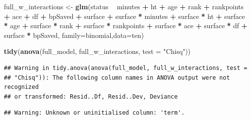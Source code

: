 \documentclass[]{article}
\newenvironment{Shaded}{\begin{snugshade}}{\end{snugshade}}
\newcommand{\DataTypeTok}[1]{\textcolor[rgb]{0.13,0.29,0.53}{#1}}
\newcommand{\KeywordTok}[1]{\textcolor[rgb]{0.13,0.29,0.53}{\textbf{#1}}}
\newcommand{\NormalTok}[1]{#1}
\newcommand{\OperatorTok}[1]{\textcolor[rgb]{0.81,0.36,0.00}{\textbf{#1}}}
\newcommand{\StringTok}[1]{\textcolor[rgb]{0.31,0.60,0.02}{#1}}
\begin{document}
\begin{Shaded}
\begin{Highlighting}[]
\NormalTok{full_w_interactions <-}\StringTok{ }\KeywordTok{glm}\NormalTok{(status }\OperatorTok{~}\StringTok{ }\NormalTok{minutes }\OperatorTok{+}\StringTok{ }\NormalTok{ht }\OperatorTok{+}\StringTok{ }\NormalTok{age }\OperatorTok{+}\StringTok{ }\NormalTok{rank }\OperatorTok{+}\StringTok{ }
\StringTok{                }\NormalTok{rankpoints }\OperatorTok{+}\StringTok{ }\NormalTok{ace }\OperatorTok{+}\StringTok{ }\NormalTok{df }\OperatorTok{+}\StringTok{ }\NormalTok{bpSaved }\OperatorTok{+}\StringTok{ }\NormalTok{surface }\OperatorTok{+}\StringTok{ }\NormalTok{surface }\OperatorTok{*}\StringTok{ }\NormalTok{minutes }\OperatorTok{+}
\StringTok{                }\NormalTok{surface }\OperatorTok{*}\StringTok{ }\NormalTok{ht }\OperatorTok{+}\StringTok{ }\NormalTok{surface }\OperatorTok{*}\StringTok{ }\NormalTok{age }\OperatorTok{+}\StringTok{ }\NormalTok{surface }\OperatorTok{*}\StringTok{ }\NormalTok{rank }\OperatorTok{+}\StringTok{ }\NormalTok{surface }\OperatorTok{*}\StringTok{ }\NormalTok{rankpoints }\OperatorTok{+}\StringTok{ }
\StringTok{                }\NormalTok{surface }\OperatorTok{*}\StringTok{ }\NormalTok{ace }\OperatorTok{+}\StringTok{ }\NormalTok{surface }\OperatorTok{*}\StringTok{ }\NormalTok{df }\OperatorTok{+}\StringTok{ }\NormalTok{surface }\OperatorTok{*}\StringTok{ }\NormalTok{bpSaved,}
                \DataTypeTok{family=}\NormalTok{binomial,}\DataTypeTok{data=}\NormalTok{ten)}
\end{Highlighting}
\end{Shaded}

\begin{Shaded}
\begin{Highlighting}[]
\KeywordTok{tidy}\NormalTok{(}\KeywordTok{anova}\NormalTok{(full_model, full_w_interactions, }\DataTypeTok{test =} \StringTok{"Chisq"}\NormalTok{))}
\end{Highlighting}
\end{Shaded}

\begin{verbatim}
## Warning in tidy.anova(anova(full_model, full_w_interactions, test =
## "Chisq")): The following column names in ANOVA output were not recognized
## or transformed: Resid..Df, Resid..Dev, Deviance
\end{verbatim}

\begin{verbatim}
## Warning: Unknown or uninitialised column: 'term'.
\end{verbatim}
\end{document}
